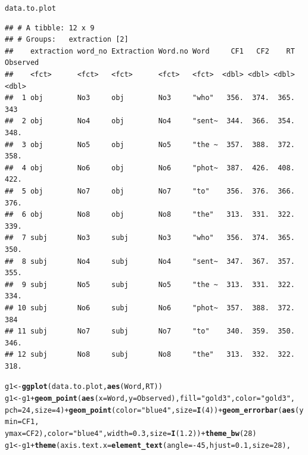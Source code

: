 \documentclass{article}\usepackage[]{graphicx}\usepackage[]{color}
\makeatletter
\newcommand{\hlnum}[1]{\textcolor[rgb]{0.686,0.059,0.569}{#1}}%
\newcommand{\hlstr}[1]{\textcolor[rgb]{0.192,0.494,0.8}{#1}}%
\newcommand{\hlopt}[1]{\textcolor[rgb]{0,0,0}{#1}}%
\newcommand{\hlstd}[1]{\textcolor[rgb]{0.345,0.345,0.345}{#1}}%
\newcommand{\hlkwb}[1]{\textcolor[rgb]{0.69,0.353,0.396}{#1}}%
\newcommand{\hlkwc}[1]{\textcolor[rgb]{0.333,0.667,0.333}{#1}}%
\newcommand{\hlkwd}[1]{\textcolor[rgb]{0.737,0.353,0.396}{\textbf{#1}}}%
\newenvironment{kframe}{%
 \def\at@end@of@kframe{}%
 \ifinner\ifhmode%
  \def\at@end@of@kframe{\end{minipage}}%
  \begin{minipage}{\columnwidth}%
 \fi\fi%
 \def\FrameCommand##1{\hskip\@totalleftmargin \hskip-\fboxsep
 \colorbox{shadecolor}{##1}\hskip-\fboxsep
     \hskip-\linewidth \hskip-\@totalleftmargin \hskip\columnwidth}%
 \MakeFramed {\advance\hsize-\width
   \@totalleftmargin\z@ \linewidth\hsize
   \@setminipage}}%
 {\par\unskip\endMakeFramed%
 \at@end@of@kframe}
\newenvironment{knitrout}{}{} %
\makeatother
\begin{document}
\begin{knitrout}
\begin{kframe}
{\ttfamily\noindent\itshape\color{messagecolor}{\#\# `summarise()` has grouped output by 'extraction'. You can override using the `.groups` argument.}}\begin{alltt}
\hlstd{data.to.plot}
\end{alltt}
\begin{verbatim}
## # A tibble: 12 x 9
## # Groups:   extraction [2]
##    extraction word_no Extraction Word.no Word     CF1   CF2    RT Observed
##    <fct>      <fct>   <fct>      <fct>   <fct>  <dbl> <dbl> <dbl>    <dbl>
##  1 obj        No3     obj        No3     "who"   356.  374.  365.     343 
##  2 obj        No4     obj        No4     "sent~  344.  366.  354.     348.
##  3 obj        No5     obj        No5     "the ~  357.  388.  372.     358.
##  4 obj        No6     obj        No6     "phot~  387.  426.  408.     422.
##  5 obj        No7     obj        No7     "to"    356.  376.  366.     376.
##  6 obj        No8     obj        No8     "the"   313.  331.  322.     339.
##  7 subj       No3     subj       No3     "who"   356.  374.  365.     350.
##  8 subj       No4     subj       No4     "sent~  347.  367.  357.     355.
##  9 subj       No5     subj       No5     "the ~  313.  331.  322.     334.
## 10 subj       No6     subj       No6     "phot~  357.  388.  372.     384 
## 11 subj       No7     subj       No7     "to"    340.  359.  350.     346.
## 12 subj       No8     subj       No8     "the"   313.  332.  322.     318.
\end{verbatim}
\begin{alltt}
\hlstd{g1} \hlkwb{<-} \hlkwd{ggplot}\hlstd{(data.to.plot,} \hlkwd{aes}\hlstd{(Word, RT))}
\hlstd{g1} \hlkwb{<-} \hlstd{g1} \hlopt{+} \hlkwd{geom_point}\hlstd{(}\hlkwd{aes}\hlstd{(}\hlkwc{x} \hlstd{= Word,} \hlkwc{y} \hlstd{= Observed),} \hlkwc{fill} \hlstd{=} \hlstr{"gold3"}\hlstd{,} \hlkwc{color} \hlstd{=} \hlstr{"gold3"}\hlstd{,}
    \hlkwc{pch} \hlstd{=} \hlnum{24}\hlstd{,} \hlkwc{size} \hlstd{=} \hlnum{4}\hlstd{)} \hlopt{+} \hlkwd{geom_point}\hlstd{(}\hlkwc{color} \hlstd{=} \hlstr{"blue4"}\hlstd{,} \hlkwc{size} \hlstd{=} \hlkwd{I}\hlstd{(}\hlnum{4}\hlstd{))} \hlopt{+} \hlkwd{geom_errorbar}\hlstd{(}\hlkwd{aes}\hlstd{(}\hlkwc{ymin} \hlstd{= CF1,}
    \hlkwc{ymax} \hlstd{= CF2),} \hlkwc{color} \hlstd{=} \hlstr{"blue4"}\hlstd{,} \hlkwc{width} \hlstd{=} \hlnum{0.3}\hlstd{,} \hlkwc{size} \hlstd{=} \hlkwd{I}\hlstd{(}\hlnum{1.2}\hlstd{))} \hlopt{+} \hlkwd{theme_bw}\hlstd{(}\hlnum{28}\hlstd{)}
\hlstd{g1} \hlkwb{<-} \hlstd{g1} \hlopt{+} \hlkwd{theme}\hlstd{(}\hlkwc{axis.text.x} \hlstd{=} \hlkwd{element_text}\hlstd{(}\hlkwc{angle} \hlstd{=} \hlopt{-}\hlnum{45}\hlstd{,} \hlkwc{hjust} \hlstd{=} \hlnum{0.1}\hlstd{,} \hlkwc{size} \hlstd{=} \hlnum{28}\hlstd{),}

\end{alltt}
\end{kframe}
\end{knitrout}
\end{document}
